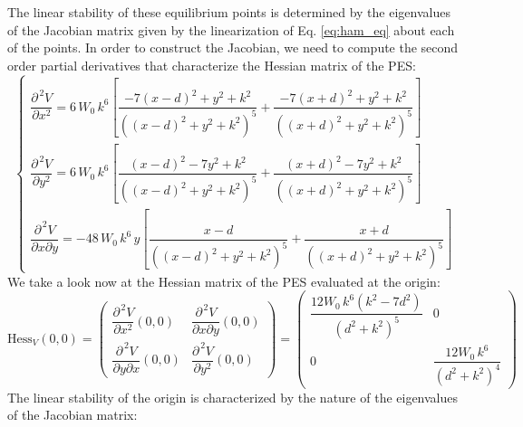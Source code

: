 \documentclass[10pt,aps,onecolumn,superscriptaddress]{revtex4-2}
\begin{document}
The linear stability of these equilibrium points is determined by the eigenvalues of the Jacobian matrix given by the linearization of Eq. \eqref{eq:ham_eq} about each of the points. In order to construct the Jacobian, we need to compute the second order partial derivatives that characterize the Hessian matrix of the PES:
\begin{equation}
\begin{cases}
\dfrac{\partial^{\,	2} V}{\partial x^2} = 6 \, W_0 \, k^6 \left[\dfrac{-7\left(x - d\right)^2 + y^2 + k^2}{\left(\left(x - d\right)^2 + y^2 + k^2\right)^5} + \dfrac{-7\left(x + d\right)^2 + y^2 + k^2}{\left(\left(x + d\right)^2 + y^2 + k^2\right)^5} \right] \\[.8cm]

\dfrac{\partial^{\,	2} V}{\partial y^2} = 6 \, W_0 \, k^6 \left[\dfrac{\left(x - d\right)^2 - 7 y^2 + k^2}{\left(\left(x - d\right)^2 + y^2 + k^2\right)^5} + \dfrac{\left(x + d\right)^2 - 7y^2 + k^2}{\left(\left(x + d\right)^2 + y^2 + k^2\right)^5} \right] \\[.8cm]

\dfrac{\partial^{\,	2} V}{\partial x \partial y} = - 48 \, W_0 \, k^6 \, y \left[\dfrac{x - d}{\left(\left(x - d\right)^2 + y^2 + k^2\right)^5} + \dfrac{x + d}{\left(\left(x + d\right)^2 + y^2 + k^2\right)^5}\right]
\end{cases}
\label{eq:second_pder}
\end{equation}
We take a look now at the Hessian matrix of the PES evaluated at the origin:
\begin{equation}
\text{Hess}_{V}(0,0) = \begin{pmatrix}
\dfrac{\partial^{\,	2} V}{\partial x^2}(0,0) & \dfrac{\partial^{\,	2} V}{\partial x \partial y}(0,0) \\[.4cm]
\dfrac{\partial^{\,	2} V}{\partial y \partial x}(0,0) & \dfrac{\partial^{\, 2} V}{\partial y^2}(0,0)
\end{pmatrix} = \begin{pmatrix}
\dfrac{12 W_0 \, k^6 \left(k^2 - 7 d^2\right)}{\left(d^2 + k^2\right)^5} & 0 \\[.5cm]
0 & \dfrac{12 W_0 \, k^6}{\left(d^2 + k^2\right)^4}
\end{pmatrix}
\end{equation}
The linear stability of the origin is characterized by the nature of the eigenvalues of the Jacobian matrix:
\end{document}
